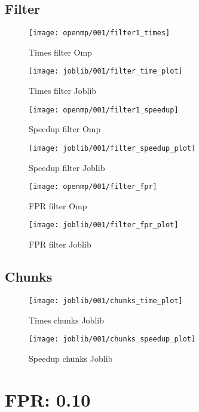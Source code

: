 \subsection{Filter}\label{subsec:filter}
\begin{figure}[H]
    \centering
    \texttt{[image: openmp/001/filter1\_times]}
        \caption{Times filter Omp}\label{fig:filter_time_omp}
    \endminipage\hfill
    \texttt{[image: joblib/001/filter\_time\_plot]}
        \caption{Times filter Joblib}\label{fig:filter_time_joblib}
    \endminipage\hfill
\end{figure}
\begin{figure}[H]
    \centering
    \texttt{[image: openmp/001/filter1\_speedup]}
        \caption{Speedup filter Omp}\label{fig:filter_speedup_omp}
    \endminipage\hfill
    \texttt{[image: joblib/001/filter\_speedup\_plot]}
        \caption{Speedup filter Joblib}\label{fig:filter_speedup_joblib}
    \endminipage\hfill
\end{figure}
\begin{figure}[H]
    \centering
    \texttt{[image: openmp/001/filter\_fpr]}
        \caption{FPR filter Omp}\label{fig:filter_fpr_omp}
    \endminipage\hfill
    \texttt{[image: joblib/001/filter\_fpr\_plot]}
        \caption{FPR filter Joblib}\label{fig:filter_fpr_joblib}
    \endminipage\hfill
\end{figure}

\subsection{Chunks}\label{subsec:chunks}
\begin{figure}[H]
    \centering
    \texttt{[image: joblib/001/chunks\_time\_plot]}
        \caption{Times chunks Joblib}\label{fig:chunks_time_joblib}
    \endminipage\hfill
    \texttt{[image: joblib/001/chunks\_speedup\_plot]}
        \caption{Speedup chunks Joblib}\label{fig:chunks_speedup_joblib}
    \endminipage\hfill
\end{figure}

\section{FPR: 0.10}\label{sec:fpr-010}
